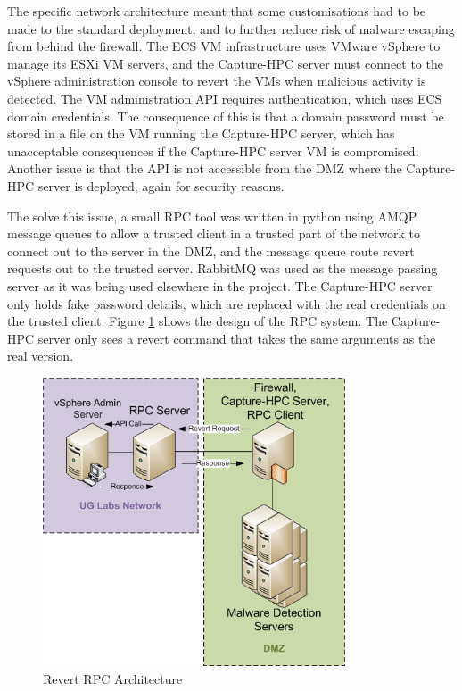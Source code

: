 The specific network architecture meant that some customisations had to be made
to the standard deployment, and to further reduce risk of malware escaping from
behind the firewall. The ECS VM infrastructure uses VMware vSphere to manage its
ESXi VM servers, and the Capture-HPC server must connect to the vSphere
administration console to revert the VMs when malicious activity is detected.
The VM administration API requires authentication, which uses ECS domain
credentials. The consequence of this is that a domain password must be stored in
a file on the VM running the Capture-HPC server, which has unacceptable
consequences if the Capture-HPC server VM is compromised. Another issue is that
the API is not accessible from the DMZ where the Capture-HPC server is deployed,
again for security reasons.

The solve this issue, a small RPC tool was written in python using AMQP message
 queues to
allow a trusted client in a trusted part of the network to connect out to the
server in the DMZ, and the message queue route revert requests out to the
trusted server. RabbitMQ was used as the message passing server as it was being
used elsewhere in the project. The Capture-HPC server only holds fake password details, which
are replaced with the real credentials on the trusted client. Figure
\ref{fig:revert-1} shows
the design of the RPC system. The Capture-HPC server only sees a
revert command that takes the same arguments as the real version. 

\begin{figure}[htb]
\centering
\includegraphics[width=0.8\textwidth]{img/revert-rpc.png}
\caption{Revert RPC Architecture}
\label{fig:revert-1}
\end{figure}

